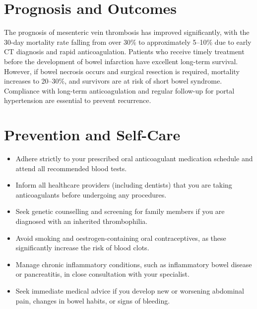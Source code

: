 \section*{Prognosis and Outcomes}
The prognosis of mesenteric vein thrombosis has improved significantly, with the 30-day mortality rate falling from over 30\% to approximately 5--10\% due to early CT diagnosis and rapid anticoagulation. Patients who receive timely treatment before the development of bowel infarction have excellent long-term survival. However, if bowel necrosis occurs and surgical resection is required, mortality increases to 20--30\%, and survivors are at risk of short bowel syndrome. Compliance with long-term anticoagulation and regular follow-up for portal hypertension are essential to prevent recurrence.

\section*{Prevention and Self-Care}
\begin{itemize}
    \item Adhere strictly to your prescribed oral anticoagulant medication schedule and attend all recommended blood tests.
    \item Inform all healthcare providers (including dentists) that you are taking anticoagulants before undergoing any procedures.
    \item Seek genetic counselling and screening for family members if you are diagnosed with an inherited thrombophilia.
    \item Avoid smoking and oestrogen-containing oral contraceptives, as these significantly increase the risk of blood clots.
    \item Manage chronic inflammatory conditions, such as inflammatory bowel disease or pancreatitis, in close consultation with your specialist.
    \item Seek immediate medical advice if you develop new or worsening abdominal pain, changes in bowel habits, or signs of bleeding.
\end{itemize}

